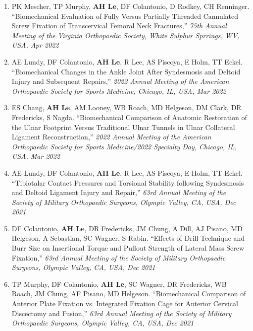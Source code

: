 \documentclass[10pt]{letter}
\begin{document}
\begin{justify}
\begin{enumerate}[leftmargin=*]
    \item PK Mescher, TP Murphy, \textbf{AH Le}, DF Colantonio, D Rodkey, CH Renninger.
        ``Biomechanical Evaluation of Fully Versus Partially Threaded Cannulated Screw Fixation of Transcervical Femoral Neck Fractures,''
        \textit{75th Annual Meeting of the Virginia Orthopaedic Society, White Sulphur Sprrings, WV, USA, Apr 2022}

    \item AE Lundy, DF Colantonio, \textbf{AH Le}, R Lee, AS Piscoya, E Holm, TT Eckel.
        ``Biomechanical Changes in the Ankle Joint After Syndesmosis and Deltoid Injury and Subsequent Repairs,''
        \textit{2022 Annual Meeting of the American Orthopaedic Society for Sports Medicine, Chicago, IL, USA, Mar 2022}

    \item ES Chang, \textbf{AH Le}, AM Looney, WB Roach, MD Helgeson, DM Clark, DR Fredericks, S Nagda.
        ``Biomechanical Comparison of Anatomic Restoration of the Ulnar Footprint Versus Traditional Ulnar Tunnels in Ulnar Collateral Ligament Reconstruction,''
        \textit{2022 Annual Meeting of the American Orthopaedic Society for Sports Medicine/2022 Specialty Day, Chicago, IL, USA, Mar 2022}
    
    \item AE Lundy, DF Colantonio, \textbf{AH Le}, R Lee, AS Piscoya, E Holm, TT Eckel.
        ``Tibiotalar Contact Pressures and Torsional Stability following Syndesmosis and Deltoid Ligament Injury and Repair,''
        \textit{63rd Annual Meeting of the Society of Military Orthopaedic Surgeons, Olympic Valley, CA, USA, Dec 2021}

    \item DF Colantonio, \textbf{AH Le}, DR Fredericks, JM Chung, A Dill, AJ Pisano, MD Helgeson, A Sebastian, SC Wagner, S Rabin.
        ``Effects of Drill Technique and Burr Size on Insertional Torque and Pullout Strength of Lateral Mass Screw Fixation,''
        \textit{63rd Annual Meeting of the Society of Military Orthopaedic Surgeons, Olympic Valley, CA, USA, Dec 2021}

    \item TP Murphy, DF Colantonio, \textbf{AH Le}, SC Wagner, DR Fredericks, WB Roach, JM Chung, AF Pisano, MD Helgeson.
        ``Biomechanical Comparison of Anterior Plate Fixation vs. Integrated Fixation Cage for Anterior Cervical Discectomy and Fusion,''
        \textit{63rd Annual Meeting of the Society of Military Orthopaedic Surgeons, Olympic Valley, CA, USA, Dec 2021}


\end{enumerate}
\end{justify}
\end{document}
